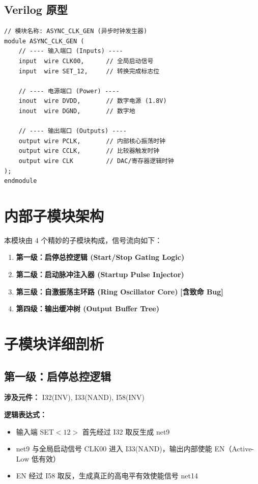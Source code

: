 \documentclass[11pt,a4paper,UTF8]{ctexart}
\begin{document}
\subsection{Verilog 原型}

\begin{lstlisting}
// 模块名称: ASYNC_CLK_GEN (异步时钟发生器)
module ASYNC_CLK_GEN (
    // ---- 输入端口 (Inputs) ----
    input  wire CLK00,      // 全局启动信号
    input  wire SET_12,     // 转换完成标志位

    // ---- 电源端口 (Power) ----
    inout  wire DVDD,       // 数字电源 (1.8V)
    inout  wire DGND,       // 数字地

    // ---- 输出端口 (Outputs) ----
    output wire PCLK,       // 内部核心振荡时钟
    output wire CCLK,       // 比较器触发时钟
    output wire CLK         // DAC/寄存器逻辑时钟
);
endmodule
\end{lstlisting}

\section{内部子模块架构}

本模块由 4 个精妙的子模块构成，信号流向如下：

\begin{enumerate}
    \item \textbf{第一级：启停总控逻辑 (Start/Stop Gating Logic)}
    \item \textbf{第二级：启动脉冲注入器 (Startup Pulse Injector)}
    \item \textbf{第三级：自激振荡主环路 (Ring Oscillator Core)} \textbf{[含致命 Bug]}
    \item \textbf{第四级：输出缓冲树 (Output Buffer Tree)}
\end{enumerate}

\section{子模块详细剖析}

\subsection{第一级：启停总控逻辑}

\textbf{涉及元件：} I32(INV), I33(NAND), I58(INV)

\textbf{逻辑表达式：}

\begin{itemize}
    \item 输入端 SET$<12>$ 首先经过 I32 取反生成 net9
    \item net9 与全局启动信号 CLK00 进入 I33(NAND)，输出内部使能 EN（Active-Low 低有效）
    \item EN 经过 I58 取反，生成真正的高电平有效使能信号 net14
\end{itemize}
\end{document}
